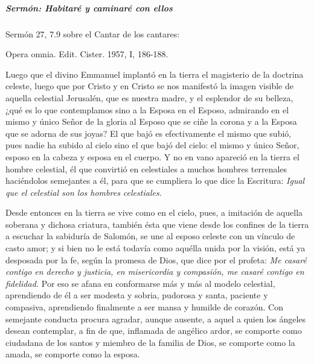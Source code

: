 \documentclass[]{article}
\let\oldsubparagraph\subparagraph
\renewcommand{\subparagraph}[1]{\oldsubparagraph{#1}\mbox{}}
\begin{document}
\subparagraph{Sermón: Habitaré y caminaré con
ellos}\label{sermuxf3n-habitaruxe9-y-caminaruxe9-con-ellos}

Sermón 27, 7.9 sobre el Cantar de los cantares:

Opera omnia. Edit. Cister. 1957, I, 186-188.

Luego que el divino Emmanuel implantó en la tierra el magisterio de la
doctrina celeste, luego que por Cristo y en Cristo se nos manifestó la
imagen visible de aquella celestial Jerusalén, que es nuestra madre, y
el esplendor de su belleza, ¿qué es lo que contemplamos sino a la Esposa
en el Esposo, admirando en el mismo y único Señor de la gloria al Esposo
que se ciñe la corona y a la Esposa que se adorna de sus joyas? El que
bajó es efectivamente el mismo que subió, pues nadie ha subido al cielo
sino el que bajó del cielo: el mismo y único Señor, esposo en la cabeza
y esposa en el cuerpo. Y no en vano apareció en la tierra el hombre
celestial, él que convirtió en celestiales a muchos hombres terrenales
haciéndolos semejantes a él, para que se cumpliera lo que dice la
Escritura: \emph{Igual que el celestial son los hombres celestiales.}

Desde entonces en la tierra se vive como en el cielo, pues, a imitación
de aquella soberana y dichosa criatura, también ésta que viene desde los
confines de la tierra a escuchar la sabiduría de Salomón, se une al
esposo celeste con un vínculo de casto amor; y si bien no le está
todavía como aquélla unida por la visión, está ya desposada por la fe,
según la promesa de Dios, que dice por el profeta: \emph{Me casaré
contigo en derecho y justicia, en misericordia y compasión, me casaré
contigo en fidelidad.} Por eso se afana en conformarse más y más al
modelo celestial, aprendiendo de él a ser modesta y sobria, pudorosa y
santa, paciente y compasiva, aprendiendo finalmente a ser mansa y
humilde de corazón. Con semejante conducta procura agradar, aunque
ausente, a aquel a quien los ángeles desean contemplar, a fin de que,
inflamada de angélico ardor, se comporte como ciudadana de los santos y
miembro de la familia de Dios, se comporte como la amada, se comporte
como la esposa.
\end{document}
